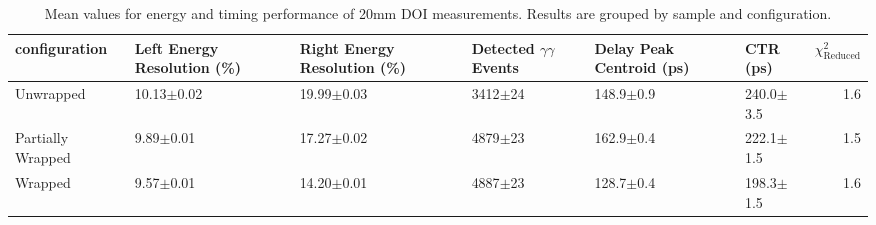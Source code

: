 \begin{table}
\caption{\label{doictrresults-20} Mean values for energy and timing performance of 20mm DOI measurements. Results are grouped by sample and configuration.}
\begin{tabular}{llllllr}
\hline
configuration & Left Energy Resolution (\%) & Right Energy Resolution (\%) & Detected $\gamma\gamma$ Events & Delay Peak Centroid (ps)  & CTR (ps) &  $\chi^2_\text{Reduced}$ \\
\hline
Unwrapped     &  10.13$\pm$0.02 &  19.99$\pm$0.03 &  3412$\pm$24 &  148.9$\pm$0.9 &  240.0$\pm$3.5 &        1.6 \\
Partially Wrapped   &   9.89$\pm$0.01 &  17.27$\pm$0.02 &  4879$\pm$23 &  162.9$\pm$0.4 &  222.1$\pm$1.5 &        1.5 \\
Wrapped       &   9.57$\pm$0.01 &  14.20$\pm$0.01 &  4887$\pm$23 &  128.7$\pm$0.4 &  198.3$\pm$1.5 &        1.6 \\
\hline
\end{tabular}
\end{table}


